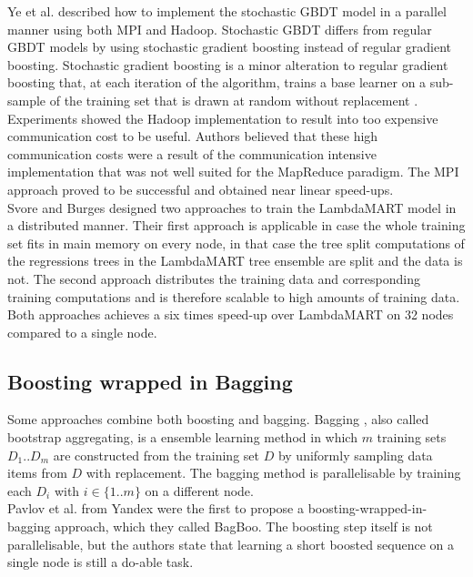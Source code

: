 Ye et al. \cite{Ye2009} described how to implement the stochastic \ac{GBDT} model in a parallel manner using both MPI and Hadoop. Stochastic \ac{GBDT} differs from regular \ac{GBDT} models by using stochastic gradient boosting instead of regular gradient boosting. Stochastic gradient boosting is a minor alteration to regular gradient boosting that, at each iteration of the algorithm, trains a base learner on a sub-sample of the training set that is drawn at random without replacement \cite{Friedman2002}. Experiments showed the Hadoop implementation to result into too expensive communication cost to be useful. Authors believed that these high communication costs were a result of the communication intensive implementation that was not well suited for the MapReduce paradigm. The MPI approach proved to be successful and obtained near linear speed-ups.\\

Svore and Burges \cite{Svore2010,Svore2012} designed two approaches to train the LambdaMART \cite{Wu2008} model in a distributed manner. Their first approach is applicable in case the whole training set fits in main memory on every node, in that case the tree split computations of the regressions trees in the LambdaMART tree ensemble are split and the data is not. The second approach distributes the training data and corresponding training computations and is therefore scalable to high amounts of training data. Both approaches achieves a six times speed-up over LambdaMART on 32 nodes compared to a single node.

\subsection{Boosting wrapped in Bagging}
Some approaches combine both boosting and bagging. Bagging \cite{Breiman1996}, also called bootstrap aggregating, is a ensemble learning method in which $m$ training sets $D_1..D_m$ are constructed from the training set $D$ by uniformly sampling data items from $D$ with replacement. The bagging method is parallelisable by training each $D_i$ with $i \in \{1..m\}$ on a different node.\\

Pavlov et al. \cite{Pavlov2010} from Yandex were the first to propose a boosting-wrapped-in-bagging approach, which they called BagBoo. The boosting step itself is not parallelisable, but the authors state that learning a short boosted sequence on a single node is still a do-able task.

